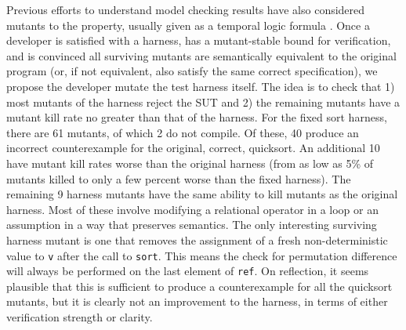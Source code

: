 \documentclass[conference]{IEEEtran}
\begin{document}
Previous efforts to understand model checking results have also
considered mutants to the property, usually given as a temporal logic
formula \cite{MutSpec}.  Once a developer is satisfied with a harness,
has a mutant-stable bound for verification, and is convinced all
surviving mutants are semantically equivalent to the original program
(or, if not equivalent, also satisfy the same correct specification),
we propose the developer mutate the test harness itself.  The
idea is to check that 1) most mutants of the harness reject the SUT
and 2) the remaining mutants have a mutant kill rate no greater than
that of the harness.  For the fixed sort harness, there are 61 mutants, of
which 2 do not compile.  Of these, 40 produce an incorrect
counterexample for the original, correct, quicksort.  An additional
10 have mutant kill rates worse than the original harness (from
as low as 5\% of mutants killed to only a few percent worse than the
fixed harness).  The remaining 9 harness mutants have the same ability to kill
mutants as the original harness.  Most of these involve modifying a
relational operator in a loop or an assumption in a way that preserves
semantics.  The only interesting surviving
harness mutant is one that removes the assignment of a fresh
non-deterministic value to {\tt v} after the call to {\tt sort}.  This
means the check for permutation difference will always be performed on
the last element of {\tt ref}.  On reflection, it seems plausible
that this is sufficient to produce a counterexample for all the quicksort mutants, but it is clearly not an improvement to the harness, in
terms of either verification strength or clarity.
\end{document}
